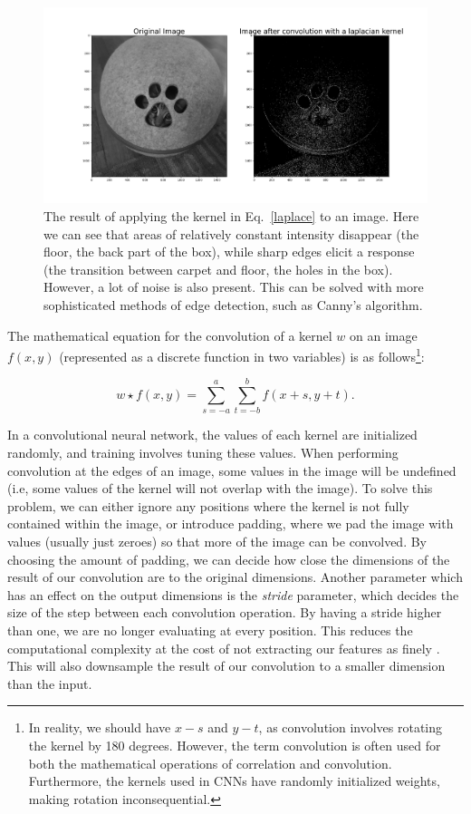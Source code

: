 \documentclass[onecolumn,10pt,cleanfoot]{asme2ej}
\begin{document}
\begin{figure}[H]
\centerline{\includegraphics[width=8in]{figure/millie.png}}
\caption{The result of applying the kernel in Eq.~\ref{laplace} to an image. Here we can see that areas of relatively constant intensity disappear (the floor, the back part of the box), while sharp edges elicit a response (the transition between carpet and floor, the holes in the box). However, a lot of noise is also present. This can be solved with more sophisticated methods of edge detection, such as Canny's algorithm.}
\label{millie}
\end{figure}

The mathematical equation for the convolution of a kernel $w$ on an image $f(x,y)$ (represented as a discrete function in two variables) is as follows\footnote{In reality, we should have $x-s$ and $y-t$, as convolution involves rotating the kernel by 180 degrees. However, the term convolution is often used for both the mathematical operations of correlation and convolution\cite[160]{dip}. Furthermore, the kernels used in CNNs have randomly initialized weights, making rotation inconsequential.}:

\begin{equation}
w \star f(x,y) = \sum^a_{s=-a} \sum^b_{t=-b}f(x+s, y+t).
\end{equation}

In a convolutional neural network, the values of each kernel are initialized randomly, and training involves tuning these values. When performing convolution at the edges of an image, some values in the image will be undefined (i.e, some values of the kernel will not overlap with the image). To solve this problem, we can either ignore any positions where the kernel is not fully contained within the image, or introduce padding, where we pad the image with values (usually just zeroes) so that more of the image can be convolved. By choosing the amount of padding, we can decide how close the dimensions of the result of our convolution are to the original dimensions. Another parameter which has an effect on the output dimensions is the {\it stride} parameter, which decides the size of the step between each convolution operation. By having a stride higher than one, we are no longer evaluating at every position. This reduces the computational complexity at the cost of not extracting our features as finely \cite[343]{gbc}. This will also downsample the result of our convolution to a smaller dimension than the input.
\end{document}
